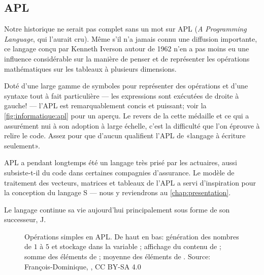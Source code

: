\subsection{APL}
\label{sec:informatique:historique:apl}

Notre historique ne serait pas complet sans un mot sur APL (\emph{A
  Programming Language}, qui l'aurait cru). Même s'il n'a jamais connu
une diffusion importante, ce langage conçu par Kenneth Iverson autour
de 1962 n'en a pas moins eu une influence considérable sur la manière
de penser et de représenter les opérations mathématiques sur les
tableaux à plusieurs dimensions.

Doté d'une large gamme de symboles pour représenter des opérations et
d'une syntaxe tout à fait particulière --- les expressions sont
exécutées de droite à gauche! --- l'APL est remarquablement concis et
puissant; voir la \autoref{fig:informatique:apl} pour un aperçu. Le
revers de la cette médaille et ce qui a assurément nui à son adoption
à large échelle, c'est la difficulté que l'on éprouve à relire le
code. Assez pour que d'aucun qualifient l'APL de «langage à écriture
seulement».

APL a pendant longtemps été un langage très prisé par les actuaires,
aussi subsiste-t-il du code dans certaines compagnies d'assurance. Le
modèle de traitement des vecteurs, matrices et tableaux de l'APL a
servi d'inspiration pour la conception du langage S --- nous y
reviendrons au \autoref{chap:presentation}.

Le langage continue sa vie aujourd'hui principalement sous forme de son
successeur, J.

\begin{figure}
  \centering
  \caption[Opérations simples en APL.]{Opérations simples en APL. De
    haut en bas: génération des nombres de $1$ à $5$ et stockage dans
    la variable ; affichage du contenu de ; somme des
    éléments de ; moyenne des éléments de . {\small Source:
    François-Dominique,
    , CC BY-SA 4.0}}
  \label{fig:informatique:apl}
\end{figure}

